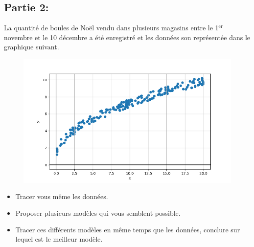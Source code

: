 \documentclass[11pt, french]{article}
\begin{document}
\subsection*{Partie 2:}
La quantité de boules de Noël vendu dans plusieurs magasins entre le 1$^\text{er}$ novembre et le 10 décembre a été enregistré et les données son représentée dans le graphique suivant.

\begin{figure}[!h]
    \center
    \includegraphics[scale=0.7]{assets/serie_2_exo_3_figure_6.png}
    \label{fig:p_s_2_exo3-fig1}
\end{figure}

\begin{itemize}
    \item Tracer vous même les données.
    \item Proposer plusieurs modèles qui vous semblent possible.
    \item Tracer ces différents modèles en même temps que les données, conclure sur lequel est le meilleur modèle.
\end{itemize}


\end{document}
